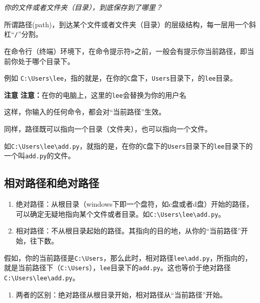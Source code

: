 \documentclass[
  letterpaper,
  DIV=11,
  numbers=noendperiod]{scrreprt}
\providecommand{\tightlist}{%
  \setlength{\itemsep}{0pt}\setlength{\parskip}{0pt}}\usepackage{longtable,booktabs,array}
\begin{document}
\emph{你的文件或者文件夹（目录），到底保存到了哪里？}

所谓路径(path)，到达某个文件或者文件夹（目录）的层级结构，每一层用一个斜杠``\texttt{/}''分割。

在命令行（终端）环境下，在命令提示符\texttt{\textgreater{}}之前，一般会有提示你当前路径，即当前你处于哪个目录下。

例如
\texttt{C:\textbackslash{}Users\textbackslash{}lee}，指的就是，在你的\texttt{C}盘下，\texttt{Users}目录下，的\texttt{lee}目录。

{\textbf{注意}}
{\textbf{注意：}}在你的电脑上，这里的\texttt{lee}会替换为你的用户名

这样，你输入的任何命令，都会对``当前路径''生效。

同样，路径既可以指向一个目录（文件夹），也可以指向一个文件。

如\texttt{C:\textbackslash{}Users\textbackslash{}lee\textbackslash{}add.py}，就指的是，在你的\texttt{C}盘下的\texttt{Users}目录下的\texttt{lee}目录下的一个叫\texttt{add.py}的文件。

\hypertarget{ux76f8ux5bf9ux8defux5f84ux548cux7eddux5bf9ux8defux5f84}{%
\subsection{相对路径和绝对路径}\label{ux76f8ux5bf9ux8defux5f84ux548cux7eddux5bf9ux8defux5f84}}

\begin{enumerate}
\def\labelenumi{\arabic{enumi}.}
\tightlist
\item
  绝对路径：从根目录（windows下即一个盘符，如c盘或者d盘）开始的路径，可以确定无疑地指向某个文件或者目录。如\texttt{C:\textbackslash{}Users\textbackslash{}lee\textbackslash{}add.py}。
\item
  相对路径：不从根目录起始的路径。其指向的目的地，从你的``当前路径''开始，往下数。
\end{enumerate}

假如，你的当前路径是\texttt{C:\textbackslash{}Users}，那么此时，相对路径\texttt{lee\textbackslash{}add.py}，所指向的，就是当前路径下（\texttt{C:\textbackslash{}Users}），\texttt{lee}目录下的\texttt{add.py}。这也等价于绝对路径\texttt{C:\textbackslash{}Users\textbackslash{}lee\textbackslash{}add.py}。

\begin{enumerate}
\def\labelenumi{\arabic{enumi}.}
\setcounter{enumi}{2}
\tightlist
\item
  两者的区别：绝对路径从根目录开始，相对路径从``当前路径''开始。
\end{enumerate}
\end{document}
